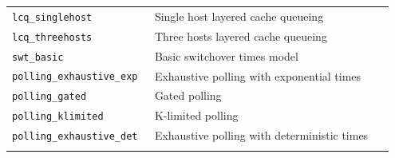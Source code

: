 \begin{footnotesize}
\begin{longtable}{|p{0.35\linewidth}|p{0.60\linewidth}|}
\hline
\texttt{lcq\_singlehost} & Single host layered cache queueing\\
\texttt{lcq\_threehosts} & Three hosts layered cache queueing\\
\hline
\texttt{swt\_basic} & Basic switchover times model\\
\hline
\texttt{polling\_exhaustive\_exp} & Exhaustive polling with exponential times\\
\texttt{polling\_gated} & Gated polling\\
\texttt{polling\_klimited} & K-limited polling\\
\texttt{polling\_exhaustive\_det} & Exhaustive polling with deterministic times\\
\label{TAB_examples_closedModel}
\end{longtable}
\end{footnotesize}

